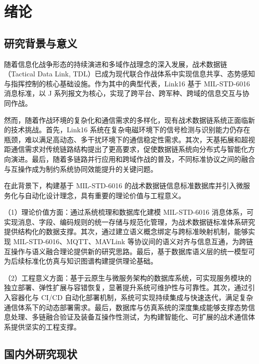 \chapter{绪论}

\section{研究背景与意义}

随着信息化战争形态的持续演进和多域作战理念的深入发展，战术数据链（Tactical Data Link, TDL）已成为现代联合作战体系中实现信息共享、态势感知与指挥控制的核心基础设施\cite{NDIA_PMW101_2024,NDIA_PMW101_2022}。作为其中的典型代表，{Link16} 基于 MIL-STD-6016 消息标准，以 J 系列报文为核心，实现了跨平台、跨军种、跨域的信息交互与协同作战\cite{DOTE_2022_MIDS_LVT,NAVAIR_MIDS_Overview}。

然而，随着作战环境的复杂化和通信需求的多样化，现有战术数据链系统正面临新的技术挑战。首先，{Link16} 系统在复杂电磁环境下的信号检测与识别能力仍存在瓶颈，难以满足高动态、多干扰环境下的通信稳定性需求\cite{AviationWeek_SDA_LEO_2024,SDA_testing_OK_2023}。其次，天基拓展和超视距通信需求对传统链路结构提出了更高要求，促使数据链系统向分布式与智能化方向演进\cite{MIL_STD_6016_Active_2024,L3Harris_MIDS_JTRS_2021}。最后，随着多链路并行应用和跨域作战的普及，不同标准协议之间的融合与互操作成为制约系统协同效能提升的关键问题。

在此背景下，构建基于 MIL-STD-6016 的战术数据链信息标准数据库并引入微服务化与自动化设计理念，具有重要的理论价值与工程意义。

（1）理论价值方面：通过系统梳理和数据库化建模 MIL-STD-6016 消息体系，可实现消息、字段、编码规则的统一存储与规范化管理，为战术数据链标准体系研究提供结构化的数据支撑。其次，通过建立语义概念绑定与跨标准映射机制，能够实现 MIL-STD-6016、MQTT、MAVLink 等协议间的语义对齐与信息互通，为跨链互操作与语义融合理论提供新的研究思路。最后，基于数据库语义层的统一模型可为后续标准化仿真与知识图谱构建提供理论基础。

（2）工程意义方面：基于云原生与微服务架构的数据库系统，可实现服务模块的独立部署、弹性扩展与容错恢复，显著提升系统可维护性与可靠性。其次，通过引入容器化与 CI/CD 自动化部署机制，系统可实现持续集成与快速迭代，满足复杂通信体系下的动态部署需求。最后，数据库与仿真系统的深度集成能够支撑态势信息处理、多链融合验证及装备互操作性测试，为构建智能化、可扩展的战术通信体系提供坚实的工程支撑。

\section{国内外研究现状}

